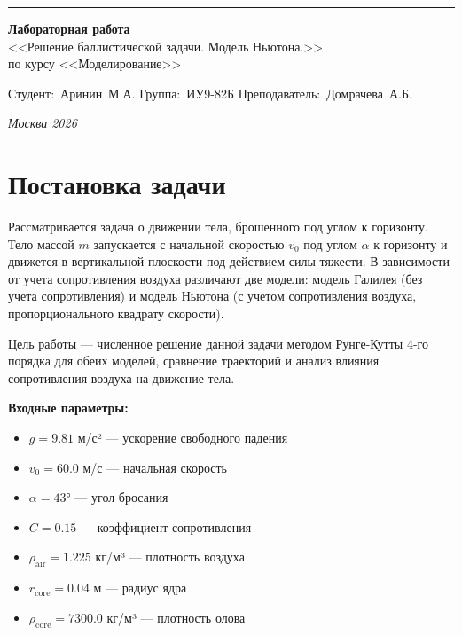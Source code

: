 \documentclass[a4paper, 14pt]{extarticle}
\begin{document}
\begin{titlepage}
\vspace*{-16pt}
\hspace{30pt}\rule{0.866\textwidth}{0.4pt}

\vspace{11em}

\begin{center}
\Large {\bf Лабораторная работа} \\ 
\large <<Решение баллистической задачи. Модель Ньютона.>> \\
\large {по курсу <<Моделирование>>} \\

\end{center}\normalsize

\vspace{8em}

\vbox{%
\hfill%
\vbox{%
\hbox{Студент: Аринин М.А.}%
\hbox{Группа: ИУ9-82Б}%
\hbox{Преподаватель: Домрачева А.Б.}%
}%
} 

\bigskip

\vfill


\begin{center}
\textsl{Москва 2026}
\end{center}
\end{titlepage}


\renewcommand{\ttdefault}{pcr}

\setlength{\tabcolsep}{3pt}

\newpage
\setcounter{page}{2}

\section{Постановка задачи}
Рассматривается задача о движении тела, брошенного под углом к горизонту. Тело массой $m$ запускается с начальной скоростью $v_0$ под углом $\alpha$ к горизонту и движется в вертикальной плоскости под действием силы тяжести. В зависимости от учета сопротивления воздуха различают две модели: модель Галилея (без учета сопротивления) и модель Ньютона (с учетом сопротивления воздуха, пропорционального квадрату скорости).

Цель работы --- численное решение данной задачи методом Рунге-Кутты 4-го порядка для обеих моделей, сравнение траекторий и анализ влияния сопротивления воздуха на движение тела.

\textbf{Входные параметры:}
\begin{itemize}
  \item $g = 9.81$ м/с² — ускорение свободного падения
  \item $v_0 = 60.0$ м/с — начальная скорость
  \item $\alpha = 43°$ — угол бросания
  \item $C = 0.15$ — коэффициент сопротивления
  \item $\rho_{\text{air}} = 1.225$ кг/м³ — плотность воздуха
  \item $r_{\text{core}} = 0.04$ м — радиус ядра
  \item $\rho_{\text{core}} = 7300.0$ кг/м³ — плотность олова
\end{itemize}
\end{document}
